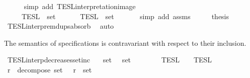 \begin{isabellebody}
\ \ \ \ \isamarkupfalse%
\ {\isacharparenleft}simp\ add{\isacharcolon}\ TESL{\isacharunderscore}interpretation{\isacharunderscore}image{\isacharparenright}\isanewline
\ \ \isamarkupfalse%
\ \isamarkupfalse%
\ {\isacartoucheopen}{\isasymInter}\ {\isacharparenleft}{\isacharparenleft}{\isasymlambda}{\isasymphi}{\isachardot}\ {\isasymlbrakk}\ {\isasymphi}\ {\isasymrbrakk}\isactrlsub T\isactrlsub E\isactrlsub S\isactrlsub L{\isacharparenright}\ {\isacharbackquote}\ set\ {\isasymPhi}{\isacharparenright}\ {\isacharequal}\ {\isasymInter}\ {\isacharparenleft}{\isacharparenleft}{\isasymlambda}{\isasymphi}{\isachardot}\ {\isasymlbrakk}\ {\isasymphi}\ {\isasymrbrakk}\isactrlsub T\isactrlsub E\isactrlsub S\isactrlsub L{\isacharparenright}\ {\isacharbackquote}\ set\ {\isasymPhi}{\isacharprime}{\isacharparenright}{\isacartoucheclose}\isanewline
\ \ \ \ \isamarkupfalse%
\ {\isacharparenleft}simp\ add{\isacharcolon}\ assms{\isacharparenright}\isanewline
\ \ \isamarkupfalse%
\ \isamarkupfalse%
\ {\isacharquery}thesis\ \isamarkupfalse%
\ TESL{\isacharunderscore}interp{\isacharunderscore}remdups{\isacharunderscore}absorb\ \isamarkupfalse%
\ auto\isanewline
{}\isamarkupfalse%
%
\endisatagproof
{\isafoldproof}%
%
\isadelimproof
%
\endisadelimproof
%
\begin{isamarkuptext}%
The semantics of specifications is contravariant with respect to their inclusion.%
\end{isamarkuptext}\isamarkuptrue%
\isamarkupfalse%
\ TESL{\isacharunderscore}interp{\isacharunderscore}decreases{\isacharunderscore}setinc{\isacharcolon}\isanewline
\ \ \ {\isacartoucheopen}set\ {\isasymPhi}\ {\isasymsubseteq}\ set\ {\isasymPhi}{\isacharprime}{\isacartoucheclose}\isanewline
\ \ \ \ \ {\isacartoucheopen}{\isasymlbrakk}{\isasymlbrakk}\ {\isasymPhi}\ {\isasymrbrakk}{\isasymrbrakk}\isactrlsub T\isactrlsub E\isactrlsub S\isactrlsub L\ {\isasymsupseteq}\ {\isasymlbrakk}{\isasymlbrakk}\ {\isasymPhi}{\isacharprime}\ {\isasymrbrakk}{\isasymrbrakk}\isactrlsub T\isactrlsub E\isactrlsub S\isactrlsub L{\isacartoucheclose}\isanewline
%
\isadelimproof
%
\endisadelimproof
%
\isatagproof
{}\isamarkupfalse%
\ {\isacharminus}\isanewline
\ \ \isamarkupfalse%
\ {\isasymPhi}\isactrlsub r\ \ decompose{\isacharcolon}\ {\isacartoucheopen}set\ {\isacharparenleft}{\isasymPhi}\ {\isacharat}\ {\isasymPhi}\isactrlsub r{\isacharparenright}\ {\isacharequal}\ set\ {\isasymPhi}{\isacharprime}{\isacartoucheclose}\ \isamarkupfalse%

\end{isabellebody}
